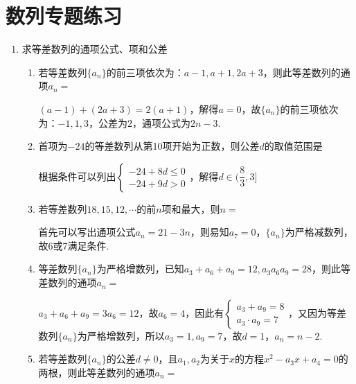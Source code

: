 \chapter*{数列专题练习}
\begin{enumerate}
    \item 求等差数列的通项公式、项和公差
    \begin{enumerate}
        \item 若等差数列$\{a_n\}$的前三项依次为：$a-1, a+1, 2a+3$，则此等差数列的通项$a_n = $
        \begin{jieda}
            $(a-1) + (2a+3) = 2(a+1)$，解得$a = 0$，故$\{a_n\}$的前三项依次为：$-1, 1, 3$，公差为$2$，通项公式为$2n-3$.
        \end{jieda}
        \item 首项为$-24$的等差数列从第10项开始为正数，则公差$d$的取值范围是\blkda{$(\dfrac{8}{3}, 3]$}
        \begin{jieda}
            根据条件可以列出$\left \{ \begin{array}{l}
                 -24 + 8d \leq 0  \\
                 -24 + 9d > 0
            \end{array}\right.$，解得$d \in (\dfrac{8}{3}, 3]$
        \end{jieda}
        \item 若等差数列$18, 15, 12, \cdots$的前$n$项和最大，则$n = $
        \begin{jieda}
            首先可以写出通项公式$a_n = 21-3n$，则易知$a_7 = 0$，$\{a_n\}$为严格减数列，故6或7满足条件.
        \end{jieda}
        \item 等差数列$\{a_n\}$为严格增数列，已知$a_3 + a_6 + a_9 = 12, a_3a_6a_9 = 28$，则此等差数列的通项$a_n = $
        \begin{jieda}
            $a_3 + a_6 + a_9 = 3a_6 = 12$，故$a_6 = 4$，因此有$\left \{\begin{array}{l}
                 a_3 + a_9 = 8  \\
                 a_3 \cdot a_9 = 7
            \end{array} \right.$，又因为等差数列$\{a_n\}$为严格增数列，所以$a_3 = 1, a_9 = 7$，故$d = 1$，$a_n = n - 2$.
        \end{jieda}
        \item 若等差数列$\{a_n\}$的公差$d \neq 0$，且$a_1, a_2$为关于$x$的方程$x^2 - a_3x + a_4 = 0$的两根，则此等差数列的通项$a_n = $
        \begin{jieda}

\end{jieda}
\end{enumerate}
\end{enumerate}
